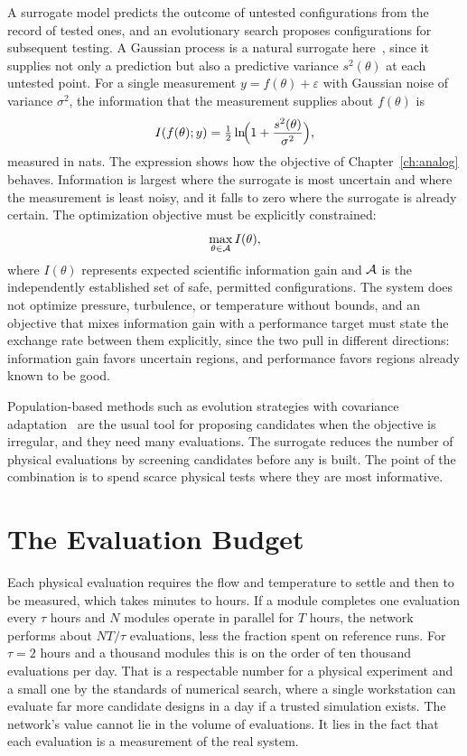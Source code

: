 A surrogate model predicts the outcome of untested configurations from the record of tested ones, and an evolutionary search proposes configurations for subsequent testing. A Gaussian process is a natural surrogate here~\cite{rasmussen2006}, since it supplies not only a prediction but also a predictive variance $s^{2}(\theta)$ at each untested point. For a single measurement $y=f(\theta)+\varepsilon$ with Gaussian noise of variance $\sigma^{2}$, the information that the measurement supplies about $f(\theta)$ is
\[
I(f(\theta);y)=\tfrac12\ln\!\Bigl(1+\frac{s^{2}(\theta)}{\sigma^{2}}\Bigr),
\]
measured in nats. The expression shows how the objective of Chapter~\ref{ch:analog} behaves. Information is largest where the surrogate is most uncertain and where the measurement is least noisy, and it falls to zero where the surrogate is already certain. The optimization objective must be explicitly constrained:
\[
\max_{\theta\in\mathcal{A}} I(\theta),
\]
where $I(\theta)$ represents expected scientific information gain and $\mathcal{A}$ is the independently established set of safe, permitted configurations. The system does not optimize pressure, turbulence, or temperature without bounds, and an objective that mixes information gain with a performance target must state the exchange rate between them explicitly, since the two pull in different directions: information gain favors uncertain regions, and performance favors regions already known to be good.

Population-based methods such as evolution strategies with covariance adaptation~\cite{hansen2001} are the usual tool for proposing candidates when the objective is irregular, and they need many evaluations. The surrogate reduces the number of physical evaluations by screening candidates before any is built. The point of the combination is to spend scarce physical tests where they are most informative.

\section{The Evaluation Budget}

Each physical evaluation requires the flow and temperature to settle and then to be measured, which takes minutes to hours. If a module completes one evaluation every $\tau$ hours and $N$ modules operate in parallel for $T$ hours, the network performs about $NT/\tau$ evaluations, less the fraction spent on reference runs. For $\tau=2$ hours and a thousand modules this is on the order of ten thousand evaluations per day. That is a respectable number for a physical experiment and a small one by the standards of numerical search, where a single workstation can evaluate far more candidate designs in a day if a trusted simulation exists. The network's value cannot lie in the volume of evaluations. It lies in the fact that each evaluation is a measurement of the real system.

